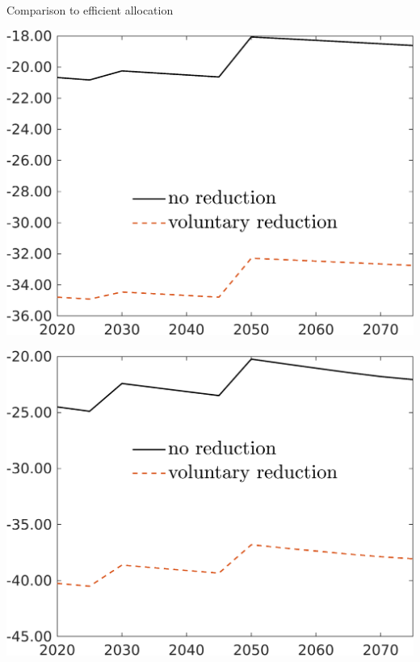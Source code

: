 \documentclass[11pt,aspectratio=169]{beamer}
\begin{document}
\begin{frame}{Comparison to efficient allocation}
	\centering
	\begin{minipage}[]{0.32\textwidth}
		\includegraphics[width=1\textwidth]{../codding_model/own_basedOnFried/optimalPol_elastS_DisuSci/figures/all_1705/hhhl_CompEffOPT_T_NoTaus_spillover0_sep1_BN1_ineq1_redCOMP_etaa0.79_lgd1.png}
	\end{minipage}
	\begin{minipage}[]{0.32\textwidth}
		\includegraphics[width=1\textwidth]{../codding_model/own_basedOnFried/optimalPol_elastS_DisuSci/figures/all_1705/hh_CompEffOPT_T_NoTaus_spillover0_sep1_BN1_ineq1_redCOMP_etaa0.79_lgd1.png}

\end{minipage}
\end{frame}
\end{document}
